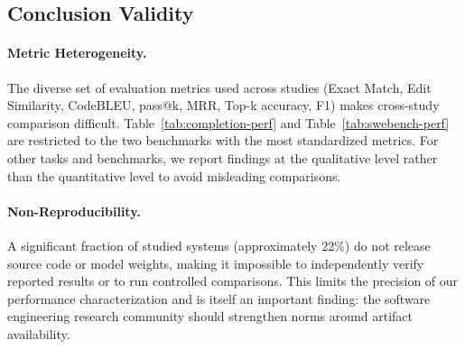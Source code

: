 \subsection{Conclusion Validity}

\paragraph{Metric Heterogeneity.}
The diverse set of evaluation metrics used across studies (Exact Match, Edit Similarity,
CodeBLEU, pass@k, MRR, Top-k accuracy, F1) makes cross-study comparison difficult.
Table~\ref{tab:completion-perf} and Table~\ref{tab:swebench-perf} are restricted to the
two benchmarks with the most standardized metrics. For other tasks and benchmarks, we report
findings at the qualitative level rather than the quantitative level to avoid misleading
comparisons.

\paragraph{Non-Reproducibility.}
A significant fraction of studied systems (approximately 22\%) do not release source code or
model weights, making it impossible to independently verify reported results or to run
controlled comparisons. This limits the precision of our performance characterization and is
itself an important finding: the software engineering research community should strengthen
norms around artifact availability.
